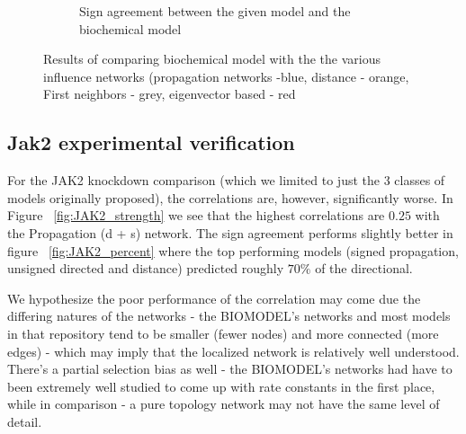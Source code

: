 \documentclass{article}
\begin{document}
\begin{figure}
\begin{subfigure}[b]{0.45\textwidth}
        \caption{Sign agreement between the given model and the biochemical model }
        \label{fig:percent_agreement_biomodel}
    \end{subfigure}
    \caption{Results of comparing biochemical model with the the various influence networks  (propagation networks -blue, distance - orange, First neighbors - grey, eigenvector based - red}  
    \label{fig:biomodel_res}
\end{figure}

\subsection{Jak2 experimental verification}

For the JAK2 knockdown comparison (which we limited to just the 3 classes of models originally proposed), the correlations are, however, significantly worse. In Figure ~\ref{fig:JAK2_strength} we see that the highest correlations are $0.25$  with the Propagation (d + s) network. The sign agreement performs slightly better in figure ~\ref{fig:JAK2_percent} where the top performing models (signed propagation, unsigned directed and distance) predicted roughly $70\%$ of the directional.

We hypothesize the poor performance of the correlation may come due the differing natures of the networks - the BIOMODEL's networks and most models in that repository tend to be smaller (fewer nodes) and more connected (more edges) - which may imply that the localized network is relatively well understood. There's a partial selection bias as well - the BIOMODEL's networks had have to been extremely well studied to come up with rate constants in the first place, while in comparison - a pure topology network may not have the same level of detail. 
\end{document}
